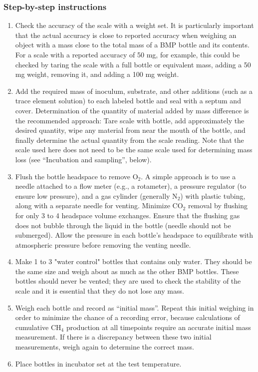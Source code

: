 \documentclass[]{article}
\begin{document}
\subsubsection*{Step-by-step instructions}
\begin{enumerate}
    \item Check the accuracy of the scale with a weight set. It is particularly important that the actual accuracy is close to reported accuracy when weighing an object with a mass close to the total mass of a BMP bottle and its contents. For a scale with a reported accuracy of  50 mg, for example, this could be checked by taring the scale with a full bottle or equivalent mass, adding a 50 mg weight, removing it, and adding a 100 mg weight.  
    \item Add the required mass of inoculum, substrate, and other additions (such as a trace element solution) to each labeled bottle and seal with a septum and cover. Determination of the quantity of material added by mass difference is the recommended approach: Tare scale with bottle, add approximately the desired quantity, wipe any material from near the mouth of the bottle, and finally determine the actual quantity from the scale reading. Note that the scale used here does not need to be the same scale used for determining mass loss (see “Incubation and sampling”, below).
    \item Flush the bottle headspace to remove O$_2$. A simple approach is to use a needle attached to a flow meter (e.g., a rotameter), a pressure regulator (to ensure low pressure), and a gas cylinder (generally N$_2$) with plastic tubing, along with a separate needle for venting. Minimize CO$_2$ removal by flushing for only 3 to 4 headspace volume exchanges. Ensure that the flushing gas does not bubble through the liquid in the bottle (needle should not be submerged). Allow the pressure in each bottle’s headspace to equilibrate with atmospheric pressure before removing the venting needle.
    \item Make 1 to 3 "water control" bottles that contains only water. They should be the same size and weigh about as much as the other BMP bottles. These bottles should never be vented; they are used to check the stability of the scale and it is essential that they do not lose any mass.
    \item Weigh each bottle and record as “initial mass”. Repeat this initial weighing in order to minimize the chance of a recording error, because calculations of cumulative CH$_4$ production at all timepoints require an accurate initial mass measurement. If there is a discrepancy between these two initial measurements, weigh again to determine the correct mass.
    \item Place bottles in incubator set at the test temperature.
\end{enumerate}
\end{document}
